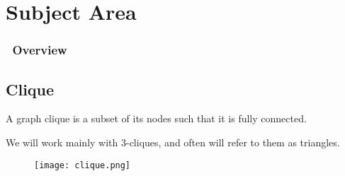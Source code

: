 \section{Subject Area}

\begin{frame}
	\frametitle{\secname\ Overview}
	\tableofcontents[currentsection]
\end{frame}

\subsection{Clique}
\begin{frame}{\subsecname}
	A graph clique is a subset of its nodes such that it is fully connected.

	We will work mainly with 3-cliques, and often will refer to them as triangles.

	\begin{figure}[H]
		\centering
		\texttt{[image: clique.png]}
	\end{figure}
\end{frame}





